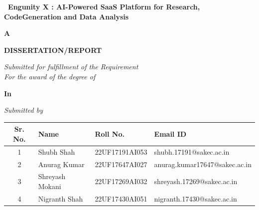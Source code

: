 \thispagestyle{empty}
\begin{center}
    { \large {\bfseries {\ Engunity X : AI-Powered SaaS Platform for Research, CodeGeneration and Data Analysis}} \par}
\vspace{1\baselineskip}
    {\large \textbf{A} \par}
\vspace{0.5\baselineskip}
    {\large \textbf{DISSERTATION/REPORT} \par} %
\vspace{0.5\baselineskip}
    {\textit{Submitted for fulfillment of the Requirement}\\
    \textit{For the award of the degree of}}\par
\vspace{\baselineskip}
    {\large \bf \mydegree \par} 
\vspace{0.5\baselineskip}
{\large \textbf{In} \par}
\vspace{0.5\baselineskip}
    {\large \bf \branch \par} 
\vspace{0.5\baselineskip}
    {\textit{Submitted by} \par}
\vspace{\baselineskip}
    \begin{table}[htbp]
\centering
\begin{tabular}{|c|l|l|l|}
\hline
\textbf{Sr. No.} & \textbf{Name} & \textbf{Roll No.} & \textbf{Email ID} \\ \hline
1 & Shubh Shah& 22UF17191AI053& shubh.17191@sakec.ac.in\\ \hline
2 & Anurag Kumar& 22UF17647AI027& anurag.kumar17647@sakec.ac.in\\ \hline
3 & Shreyash Mokani& 22UF17269AI032& shreyash.17269@sakec.ac.in\\ \hline
4 & Nigranth Shah& 22UF17430AI051& nigranth.17430@sakec.ac.in\\ \hline
\end{tabular}
\end{table}


\end{center}
